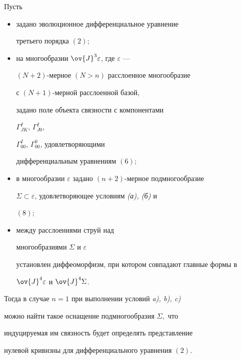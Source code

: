 \begin{thmnonum}


Пусть


\begin{itemize}


\item[1)] задано эволюционное дифференциальное уравнение 


третьего порядка $(2);$


\item[2)] на многообразии $\ov{J}^3\varepsilon$, где $\varepsilon$ ---


$(N+2)$-мерное $(N>n)$ расслоенное многообразие 


с $(N+1)$-мерной расслоенной базой,


задано поле объекта связности с компонентами


$\Gamma^I_{JK}$, $\Gamma^I_{J0}$,


$\Gamma^I_{00}$, $\Gamma^0_{00}$, удовлетворяющими


дифференциальным уравнениям $(6);$


\item[3)] в многообразии $\varepsilon$ задано $(n+2)$-мерное подмногообразие


$\Sigma\subset\varepsilon$, удовлетворяющее условиям {\em (а), (б)} и


$(8);$


\item[4)] между расслоениями струй над 


многообразиями $\Sigma$ и $\varepsilon$


установлен диффеоморфизм, при котором совпадают главные формы в


$\ov{J}^4\varepsilon$ и $\ov{J}^4\Sigma$.


\end{itemize}





Тогда в случае $n=1$ при выполнении условий {\em a), b), c)}


можно найти такое оснащение подмногообразия $\Sigma,$ что


индуцируемая им связность будет определять представление


нулевой кривизны для дифференциального уравнения $(2)$.


\end{thmnonum}





